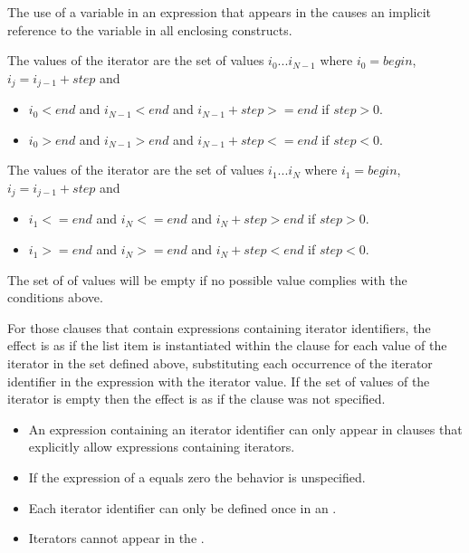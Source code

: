 The use of a variable in an expression that appears in the  causes an implicit reference to the variable in all enclosing constructs.

\begin{ccppspecific}
The values of the iterator are the set of values $i_{0}$...$i_{N-1}$ where $i_{0}=begin$,  $i_{j}=i_{j-1} + step$ and
\begin{itemize}
\item $i_{0} < end$ and $i_{N-1} < end$ and $i_{N-1} + step >= end$ if $step > 0$.
\item $i_{0} > end$ and $i_{N-1} > end$ and $i_{N-1} + step <= end$ if $step < 0$.
\end{itemize}
\end{ccppspecific}
\begin{fortranspecific}
The values of the iterator are the set of values $i_{1}$...$i_{N}$ where $i_{1}=begin$,  $i_{j}=i_{j-1} + step$ and
\begin{itemize}
\item $i_{1} <= end$ and $i_{N} <= end$ and $i_{N} + step > end$ if $step > 0$.
\item $i_{1} >= end$ and $i_{N} >= end$ and $i_{N} + step < end$ if $step < 0$.
\end{itemize}
\end{fortranspecific}
The set of of values will be empty if no possible value complies with the conditions above.

 For those clauses that contain expressions containing iterator identifiers, the
effect is as if the list item is instantiated within the clause for each
value of the iterator in the set defined above, substituting each occurrence of
the iterator identifier in the expression with the iterator value. If the set of values of the iterator is empty then the effect is as if the clause was not specified.

\restrictions

\begin{itemize}
\item An expression containing an iterator identifier can only appear in clauses that explicitly allow expressions containing iterators.
\item If the  expression of a  equals zero the behavior is unspecified.
\item Each iterator identifier can only be defined once in an .
\item Iterators cannot appear in the .
\end{itemize}


